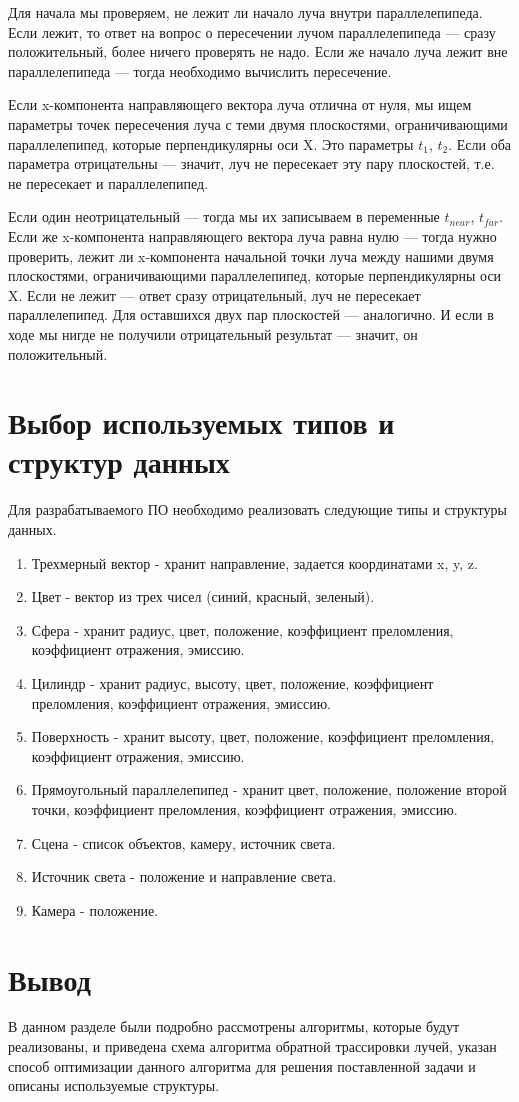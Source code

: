 Для начала мы проверяем, не лежит ли начало луча внутри параллелепипеда. Если лежит, то ответ на вопрос о пересечении лучом параллелепипеда --- сразу положительный, более ничего проверять не надо. 
Если же начало луча лежит вне параллелепипеда --- тогда необходимо вычислить пересечение.

Если x-компонента направляющего вектора луча отлична от нуля, мы ищем параметры точек пересечения луча с теми двумя плоскостями, ограничивающими параллелепипед, которые перпендикулярны оси X. Это параметры $t_1$, $t_2$. 
Если оба параметра отрицательны --- значит, луч не пересекает эту пару плоскостей, т.е. не пересекает и параллелепипед. 

Если один неотрицательный --- тогда мы их записываем в переменные $t_{near}$, $t_{far}$. Если же x-компонента направляющего вектора луча равна нулю --- тогда нужно проверить, лежит ли x-компонента начальной точки луча между нашими двумя плоскостями, ограничивающими параллелепипед, которые перпендикулярны оси X. 
Если не лежит --- ответ сразу отрицательный, луч не пересекает параллелепипед. Для оставшихся двух пар плоскостей --- аналогично. И если в ходе мы нигде не получили отрицательный результат --- значит, он положительный.

\section{Выбор используемых типов и структур данных} 

Для разрабатываемого ПО необходимо реализовать следующие типы и структуры данных.
\begin{enumerate}
	
	\item Трехмерный вектор - хранит направление, задается координатами x, y, z.
	
	\item Цвет - вектор из трех чисел (синий, красный, зеленый).
	\item Сфера - хранит радиус, цвет, положение, коэффициент преломления, коэффициент отражения, эмиссию.
	\item Цилиндр - хранит радиус, высоту, цвет, положение, коэффициент преломления, коэффициент отражения, эмиссию.
	\item Поверхность - хранит высоту, цвет, положение, коэффициент преломления, коэффициент отражения, эмиссию.
	\item Прямоугольный параллелепипед - хранит цвет, положение, положение второй точки, коэффициент преломления, коэффициент отражения, эмиссию.
	\item Сцена - список объектов, камеру, источник света.
	\item Источник света - положение и направление света.
	\item Камера - положение.
	
\end{enumerate}


\section*{Вывод}
В данном разделе были подробно рассмотрены алгоритмы, которые будут реализованы, и приведена схема алгоритма обратной трассировки лучей, указан способ оптимизации данного алгоритма для решения поставленной задачи и описаны используемые структуры.